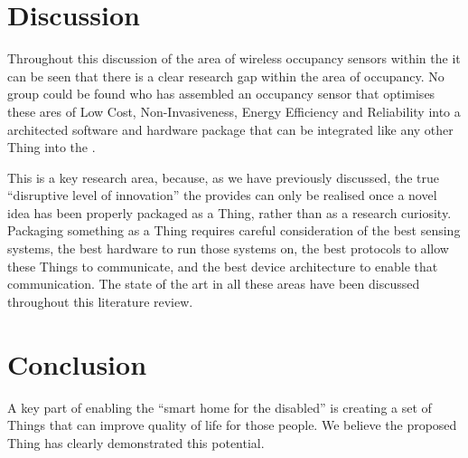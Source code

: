 \documentclass[../thesis/thesis.tex]{subfiles}
\begin{document}
\section{Discussion}
\label{sec:litreview:discussion}
Throughout this discussion of the area of wireless occupancy sensors within the \iot it can be seen that there is a clear research gap within the area of occupancy. No group could be found who has assembled an occupancy sensor that optimises these ares of Low Cost, Non-Invasiveness, Energy Efficiency and Reliability into a architected software and hardware package that can be integrated like any other Thing into the \iot.

This is a key research area, because, as we have previously discussed, the true ``disruptive level of innovation''\cite{atzori2010internet} the \iot provides can only be realised once a novel idea has been properly packaged as a Thing, rather than as a research curiosity. Packaging something as a Thing requires careful consideration of the best sensing systems, the best hardware to run those systems on, the best protocols to allow these Things to communicate, and the best device architecture to enable that communication. The state of the art in all these areas have been discussed throughout this literature review.

\section{Conclusion}
\label{sec:litreview:conclusion}
A key part of enabling the ``smart home for the disabled'' is creating a set of Things that can improve quality of life for those people. We believe the proposed Thing has clearly demonstrated this potential.


\end{document}
